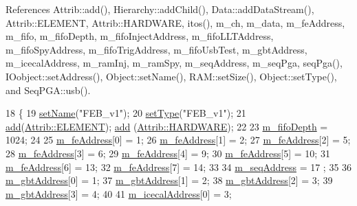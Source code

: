 References Attrib\+::add(), Hierarchy\+::add\+Child(), Data\+::add\+Data\+Stream(), Attrib\+::\+E\+L\+E\+M\+E\+NT, Attrib\+::\+H\+A\+R\+D\+W\+A\+RE, itos(), m\+\_\+ch, m\+\_\+data, m\+\_\+fe\+Address, m\+\_\+fifo, m\+\_\+fifo\+Depth, m\+\_\+fifo\+Inject\+Address, m\+\_\+fifo\+L\+L\+T\+Address, m\+\_\+fifo\+Spy\+Address, m\+\_\+fifo\+Trig\+Address, m\+\_\+fifo\+Usb\+Test, m\+\_\+gbt\+Address, m\+\_\+icecal\+Address, m\+\_\+ram\+Inj, m\+\_\+ram\+Spy, m\+\_\+seq\+Address, m\+\_\+seq\+Pga, seq\+Pga(), I\+Oobject\+::set\+Address(), Object\+::set\+Name(), R\+A\+M\+::set\+Size(), Object\+::set\+Type(), and Seq\+P\+G\+A\+::usb().


\begin{DoxyCode}
18                  \{
19   \hyperlink{classObject_ae30fea75683c2d149b6b6d17c09ecd0c}{setName}(\textcolor{stringliteral}{"FEB\_v1"});
20   \hyperlink{classObject_aae534cc9d982bcb9b99fd505f2e103a5}{setType}(\textcolor{stringliteral}{"FEB\_v1"});
21   \hyperlink{classAttrib_a235f773af19c900264a190b00a3b4ad7}{add}(\hyperlink{classAttrib_a69e171d7cc6417835a5a306d3c764235a7788bc5dd333fd8ce18562b269c9dab1}{Attrib::ELEMENT}); \hyperlink{classAttrib_a235f773af19c900264a190b00a3b4ad7}{add} (\hyperlink{classAttrib_a69e171d7cc6417835a5a306d3c764235a61ceb22149f365f1780d18f9d1459423}{Attrib::HARDWARE});
22 
23   \hyperlink{classFEB__v1_a30473bcdd8f018ad5dac728f6779df9c}{m\_fifoDepth} = 1024;
24 
25   \hyperlink{classFEB__v1_a4e1945c2d5b434125f375e9d0fc6d99f}{m\_feAddress}[0] = 1;
26   \hyperlink{classFEB__v1_a4e1945c2d5b434125f375e9d0fc6d99f}{m\_feAddress}[1] = 2;
27   \hyperlink{classFEB__v1_a4e1945c2d5b434125f375e9d0fc6d99f}{m\_feAddress}[2] = 5;
28   \hyperlink{classFEB__v1_a4e1945c2d5b434125f375e9d0fc6d99f}{m\_feAddress}[3] = 6;
29   \hyperlink{classFEB__v1_a4e1945c2d5b434125f375e9d0fc6d99f}{m\_feAddress}[4] = 9;
30   \hyperlink{classFEB__v1_a4e1945c2d5b434125f375e9d0fc6d99f}{m\_feAddress}[5] = 10;
31   \hyperlink{classFEB__v1_a4e1945c2d5b434125f375e9d0fc6d99f}{m\_feAddress}[6] = 13;
32   \hyperlink{classFEB__v1_a4e1945c2d5b434125f375e9d0fc6d99f}{m\_feAddress}[7] = 14;
33 
34   \hyperlink{classFEB__v1_a1c1eb093fd1733b9510fcf8bc5c7ad08}{m\_seqAddress}   = 17 ; 
35 
36   \hyperlink{classFEB__v1_ac625855df976f16694178f1a4c0eef1e}{m\_gbtAddress}[0] = 1;
37   \hyperlink{classFEB__v1_ac625855df976f16694178f1a4c0eef1e}{m\_gbtAddress}[1] = 2;
38   \hyperlink{classFEB__v1_ac625855df976f16694178f1a4c0eef1e}{m\_gbtAddress}[2] = 3;
39   \hyperlink{classFEB__v1_ac625855df976f16694178f1a4c0eef1e}{m\_gbtAddress}[3] = 4;
40     
41   \hyperlink{classFEB__v1_adf21041831669e75283dd2a88fbaddf5}{m\_icecalAddress}[0] = 3;

\end{DoxyCode}
